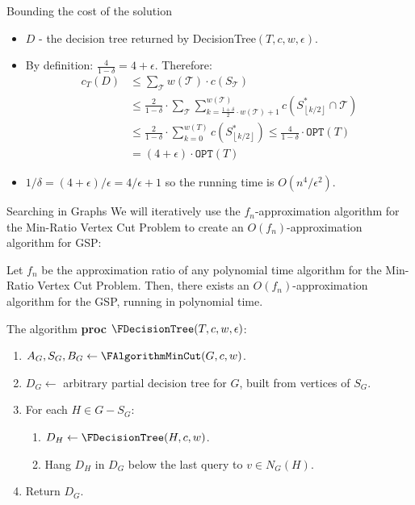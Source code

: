 \documentclass{beamer}
\newcommand{\br}[1]{\mathopen{}\left( #1 \right)}
\newcommand{\fl}[1]{\mathopen{}\left\lfloor #1 \right\rfloor}
\newcommand{\OPT}{\texttt{OPT}}
\begin{document}
\begin{frame}{Bounding the cost of the solution }
\begin{itemize}
    \item $D$ - the decision tree returned by DecisionTree$\br{T,c,w,\epsilon}$.
    \pause 
    \item By definition: $\frac{4}{1-\delta}=4+\epsilon$. Therefore:\pause
    \begin{align*}
            c_T\br{D} &\leq \sum_{\mathcal{T}} w\br{\mathcal{T}}\cdot c\br{S_\mathcal{T}}
            \\&\leq 
            \frac{2}{1-\delta}\cdot\sum_{\mathcal{T}}\sum_{k=\frac{1+\delta}{2}\cdot w\br{\mathcal{T}}+1}^{w\br{\mathcal{T}}}c\br{S_{\fl{k/2}}^*\cap \mathcal{T}}\\
            &\leq \frac{2}{1-\delta}\cdot\sum_{k=0}^{w\br{T}}c\br{S_{\fl{k/2}}^*}\leq \frac{4}{1-\delta}\cdot\OPT\br{T} 
            \\&= \br{4+\epsilon}\cdot\OPT\br{T}
    \end{align*}
    \pause
    \item $1/\delta=\br{4+\epsilon}/\epsilon=4/\epsilon+1$ so the running time is $O\br{n^4/\epsilon^2}$.
\end{itemize} 
\end{frame}

\begin{frame}{Searching in Graphs}
We will iteratively use the $f_n$-approximation algorithm for the Min-Ratio Vertex Cut Problem to create an $O\br{f_n}$-approximation algorithm for GSP:
\pause
\begin{theorem}
    Let $f_n$ be the approximation ratio of any polynomial time algorithm for the Min-Ratio Vertex Cut Problem. Then, there exists an $O\br{f_n}$-approximation algorithm for the GSP, running in polynomial time.
\end{theorem}
    
\end{frame}

\begin{frame}{The algorithm}
\textbf{proc} $\FDecisionTree\br{T,c,w,\epsilon}$:
\begin{enumerate}
    \item $A_G,S_G, B_G\gets\FAlgorithmMinCut\br{G, c, w}$.
    \item $D_G\gets$ arbitrary partial decision tree for $G$, built from vertices of $S_G$.
    \item For each $H\in G-S_G$:
    \begin{enumerate}
        \item $D_H\gets \FDecisionTree\br{H, c, w}$.
        \item Hang $D_H$ in $D_G$ below the last query to $v\in N_G\br{H}$.
    \end{enumerate}
    \item Return $D_G$.
\end{enumerate}
\end{frame}
\end{document}
